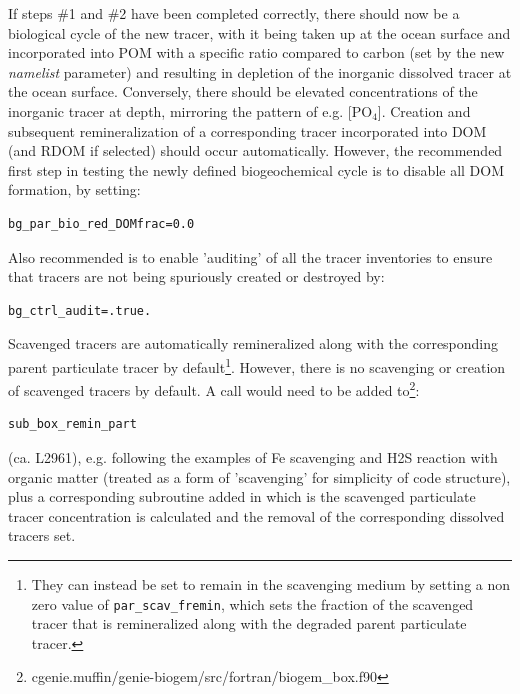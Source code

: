 \documentclass[11pt,fleqn]{book} %
\begin{document}
If steps \#1 and \#2 have been completed correctly, there should now be a biological cycle of the new tracer, with it being taken up at the ocean surface and incorporated into POM with a specific ratio compared to carbon (set by the new \textit{namelist} parameter) and resulting in depletion of the inorganic dissolved tracer at the ocean surface. Conversely, there should be elevated concentrations of the inorganic tracer at depth, mirroring the pattern of e.g. [PO\(_{4}\)].
Creation and subsequent remineralization of a corresponding tracer incorporated into DOM (and RDOM if selected) should occur automatically. However, the recommended first step in testing the newly defined biogeochemical cycle
is to disable all DOM formation, by setting:
\vspace{-5pt}\begin{verbatim}
bg_par_bio_red_DOMfrac=0.0
\end{verbatim}\vspace{-5pt}
Also recommended is to enable 'auditing' of all the tracer inventories to ensure that tracers are not being spuriously created or destroyed by:
\vspace{-5pt}\begin{verbatim}
bg_ctrl_audit=.true.
\end{verbatim}\vspace{-5pt}

Scavenged tracers are  automatically  remineralized along with the corresponding parent particulate tracer by default\footnote{They can instead be set to remain in the scavenging medium by setting a non zero value of \texttt{par\_scav\_fremin}, which sets the fraction of the scavenged tracer that is remineralized along with the degraded parent particulate tracer.}.
However, there is no scavenging or creation of scavenged tracers by default. A call would need to be added to\footnote{cgenie.muffin/genie-biogem/src/fortran/biogem\_box.f90}:
\vspace{-1mm}\small\begin{verbatim}
sub_box_remin_part
\end{verbatim}\vspace{-1mm}\normalsize
(ca. L2961), e.g. following the examples of Fe scavenging and H2S reaction with organic matter (treated as a form of 'scavenging' for simplicity of code structure), plus a corresponding subroutine added in which is the scavenged particulate tracer concentration is calculated and the removal of the corresponding dissolved tracers set. 

%
\end{document}
